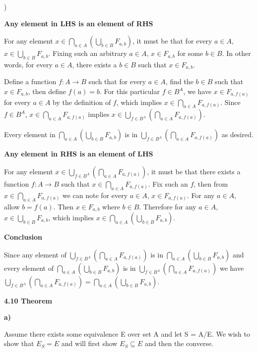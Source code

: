 \documentclass{article}
\begin{document}
)

\medskip
\textbf{Any element in LHS is an element of RHS}
\medskip

For any element $x \in \bigcap_{a \in A}(\bigcup_{b \in B} F_{a,b})$, it must be that for every $a \in A$, $x \in \bigcup_{b \in B}F_{a,b}$. Fixing such an arbitrary $a \in A$, $x \in F_{a,b}$ for some $b \in B$. In other words, for every $a \in A$, there exists a $b \in B$ such that $x \in F_{a,b}$. 

\medskip
Define a function $f: A \xrightarrow{} B$ such that for every $a \in A$, find the $b \in B$ such that $x \in F_{a,b}$, then define $f(a) = b$. For this particular $f \in B^{A}$, we have $x \in F_{a,f(a)}$ for every $a \in A$ by the definition of $f$, which implies $x \in \bigcap_{a \in A}F_{a, f(a)}$. Since $f \in B^{A}$, $x \in \bigcap_{a \in A}F_{a, f(a)}$ implies $x \in \bigcup_{f \in B^{A}}(\bigcap_{a \in A}F_{a, f(a)})$.

\medskip
Every element in $\bigcap_{a \in A}(\bigcup_{b \in B} F_{a,b})$ is in $\bigcup_{f \in B^{A}}(\bigcap_{a \in A}F_{a, f(a)})$ as desired.

\medskip
\textbf{Any element in RHS is an element of LHS}
\medskip

For any element $x \in \bigcup_{f \in B^{A}}(\bigcap_{a \in A} F_{a, f(a)})$, it must be that there exists a function $f: A \xrightarrow{} B$ such that $x \in \bigcap_{a \in A} F_{a,f(a)}$. Fix such an $f$, then from $x \in \bigcap_{a \in A} F_{a,f(a)}$ we can note for every $a \in A$, $x \in F_{a,f(a)}$. For any $a \in A$, allow $b = f(a)$. Then $x \in F_{a,b}$ where $b \in B$. Therefore for any $a \in A$, $x \in \bigcup_{b \in B}F_{a,b}$, which implies $x \in \bigcap_{a \in A}(\bigcup_{b \in B}F_{a,b})$.

\newpage
\textbf{Conclusion}
\medskip

Since any element of $\bigcup_{f \in B^{A}}(\bigcap_{a \in A}F_{a, f(a)})$ is in $\bigcap_{a \in A}(\bigcup_{b \in B}F_{a,b})$ and every element of $\bigcap_{a \in A}(\bigcup_{b \in B}F_{a,b})$ is in $\bigcup_{f \in B^{A}}(\bigcap_{a \in A}F_{a, f(a)})$ we have $\bigcup_{f \in B^{A}}(\bigcap_{a \in A}F_{a, f(a)}) =  \bigcap_{a \in A}(\bigcup_{b \in B}F_{a,b})$.

\bigskip
\textbf{4.10 Theorem}

\medskip
\textbf{a)}
\medskip

Assume there exists some equivalence E over set A and let S = A/E. We wish to show that $E_S = E$ and will first show $E_S \subseteq E$ and then the converse.
\end{document}

